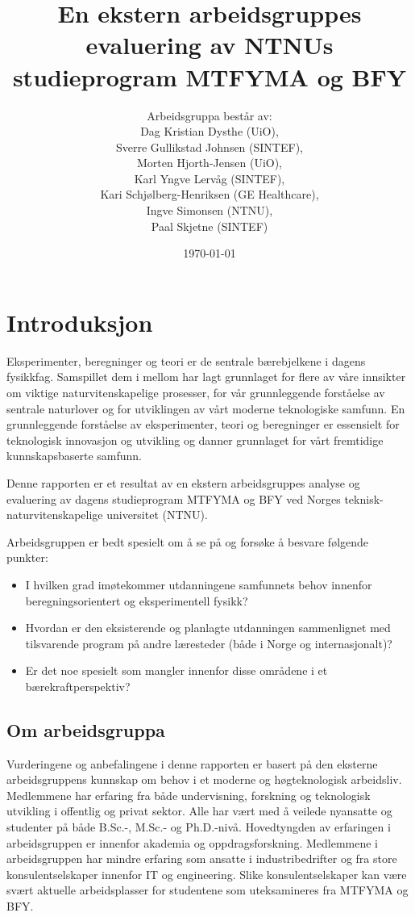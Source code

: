 \documentclass{article}
\title{En ekstern arbeidsgruppes evaluering av NTNUs studieprogram MTFYMA og BFY}
\author{Arbeidsgruppa består av: \\ Dag Kristian Dysthe (UiO), \\ Sverre Gullikstad Johnsen (SINTEF), \\ Morten Hjorth-Jensen (UiO), \\ Karl Yngve Lervåg (SINTEF), \\ Kari Schjølberg-Henriksen (GE Healthcare), \\ Ingve Simonsen (NTNU), \\ Paal Skjetne (SINTEF)}
\date{\today}
\begin{document}
\maketitle



\newpage
\tableofcontents

\newpage
\section{Introduksjon}
Eksperimenter, beregninger og teori er de sentrale bærebjelkene i dagens fysikkfag. Samspillet dem i mellom  har lagt grunnlaget for flere av våre innsikter om viktige naturvitenskapelige prosesser, for vår grunnleggende forståelse av sentrale naturlover og for utviklingen av vårt moderne teknologiske samfunn. En grunnleggende forståelse av eksperimenter, teori og beregninger er essensielt for  teknologisk innovasjon og utvikling og danner grunnlaget for vårt fremtidige kunnskapsbaserte samfunn.

Denne rapporten er et resultat av en ekstern arbeidsgruppes analyse og evaluering av dagens studieprogram MTFYMA og BFY ved Norges teknisk-naturvitenskapelige universitet (NTNU).

Arbeidsgruppen er bedt spesielt om å se på og forsøke å besvare følgende punkter:
\begin{itemize}
  \item I hvilken grad imøtekommer utdanningene samfunnets behov innenfor beregningsorientert og eksperimentell fysikk?
  \item Hvordan er den eksisterende og planlagte utdanningen sammenlignet med tilsvarende program på andre læresteder (både i Norge og internasjonalt)?
  \item Er det noe spesielt som mangler innenfor disse områdene i et bærekraftperspektiv?
\end{itemize}

\subsection{Om arbeidsgruppa}
Vurderingene og anbefalingene i denne rapporten er basert på den eksterne arbeidsgruppens kunnskap om behov i et moderne og høgteknologisk arbeidsliv.  Medlemmene har erfaring fra både undervisning, forskning og teknologisk utvikling i offentlig og privat sektor. Alle har vært med å veilede nyansatte og studenter på både B.Sc.-, M.Sc.- og Ph.D.-nivå. Hovedtyngden av erfaringen i arbeidsgruppen er innenfor akademia og oppdragsforskning. Medlemmene i arbeidsgruppen har mindre erfaring som ansatte i industribedrifter og fra store konsulentselskaper innenfor IT og engineering. Slike konsulentselskaper kan være svært aktuelle arbeidsplasser for studentene som uteksamineres fra MTFYMA og BFY.
\end{document}
